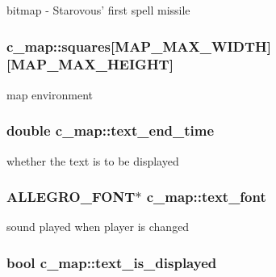 bitmap -\/ Starovous' first spell missile \hypertarget{classc__map_ad2884dc5a43ee568bad98b47f8eebef5}{
\subsubsection[{squares}]{ c\-\_\-map\-::squares\mbox{[}M\-A\-P\-\_\-\-M\-A\-X\-\_\-\-W\-I\-D\-T\-H\mbox{]}\mbox{[}M\-A\-P\-\_\-\-M\-A\-X\-\_\-\-H\-E\-I\-G\-H\-T\mbox{]}\hspace{0.3cm}{\ttfamily [protected]}}}\label{classc__map_ad2884dc5a43ee568bad98b47f8eebef5}
map environment \hypertarget{classc__map_ad911699c6d1ad83868e75551d138b4e7}{
\subsubsection[{text\-\_\-end\-\_\-time}]{\setlength{\rightskip}{0pt plus 5cm}double c\-\_\-map\-::text\-\_\-end\-\_\-time\hspace{0.3cm}{\ttfamily [protected]}}}\label{classc__map_ad911699c6d1ad83868e75551d138b4e7}
whether the text is to be displayed \hypertarget{classc__map_ada9b97f91338614f93a9a95fdfd7157b}{
\subsubsection[{text\-\_\-font}]{\setlength{\rightskip}{0pt plus 5cm}A\-L\-L\-E\-G\-R\-O\-\_\-\-F\-O\-N\-T$\ast$ c\-\_\-map\-::text\-\_\-font\hspace{0.3cm}{\ttfamily [protected]}}}\label{classc__map_ada9b97f91338614f93a9a95fdfd7157b}
sound played when player is changed \hypertarget{classc__map_a6273cd823e9d08f0b277e6407b468ff3}{
\subsubsection[{text\-\_\-is\-\_\-displayed}]{\setlength{\rightskip}{0pt plus 5cm}bool c\-\_\-map\-::text\-\_\-is\-\_\-displayed\hspace{0.3cm}{\ttfamily [protected]}}}\label{classc__map_a6273cd823e9d08f0b277e6407b468ff3}

